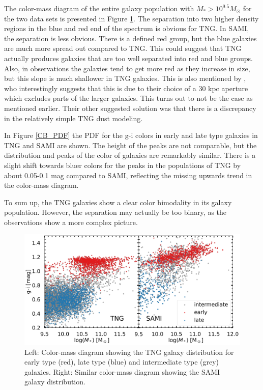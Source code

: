 The color-mass diagram of the entire galaxy population with $M_\ast > 10^{9.5}M_{\odot}$ for the two data sets is presented in Figure \ref{CB}. The separation into two higher density regions in the blue and red end of the spectrum is obvious for TNG. In SAMI, the separation is less obvious. There is a defined red group, but the blue galaxies are much more spread out compared to TNG. This could suggest that TNG actually produces galaxies that are too well separated into red and blue groups. Also, in observations the galaxies tend to get more red as they increase in size, but this slope is much shallower in TNG galaxies. This is also mentioned by \textcite{Nelson2017}, who interestingly suggests that this is due to their choice of a 30 kpc aperture which excludes parts of the larger galaxies. This turns out to not be the case as mentioned earlier. Their other suggested solution was that there is a discrepancy in the relatively simple TNG dust modeling. 

In Figure \ref{CB_PDF} the PDF for the g-i colors in early and late type galaxies in TNG and SAMI are shown. The height of the peaks are not comparable, but the distribution and peaks of the color of galaxies are remarkably similar. There is a slight shift towards bluer colors for the peaks in the populations of TNG by about 0.05-0.1 mag compared to SAMI, reflecting the missing upwards trend in the color-mass diagram. 

To sum up, the TNG galaxies show a clear color bimodality in its galaxy population. However, the separation may actually be too binary, as the observations show a more complex picture.

\begin{figure}
    \centering
    \includegraphics[width=\textwidth]{images/CB.png}
    \caption{Left: Color-mass diagram showing the TNG galaxy distribution for early type (red), late type (blue) and intermediate type (grey) galaxies. Right: Similar color-mass diagram showing the SAMI galaxy distribution.}
    \label{CB}
\end{figure}

